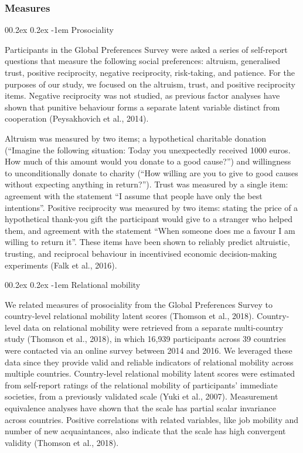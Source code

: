 \documentclass[
  man,floatsintext]{apa6}
\makeatletter
\let\oldparagraph\paragraph
\renewcommand{\paragraph}[1]{\oldparagraph{#1}\mbox{}}
\renewcommand{\paragraph}{\@startsection{paragraph}{4}{\parindent}%
  {0\baselineskip \@plus 0.2ex \@minus 0.2ex}%
  {-1em}%
  {\normalfont\normalsize\bfseries\itshape\typesectitle}}
\makeatother
\begin{document}
\hypertarget{measures}{%
\subsubsection{Measures}\label{measures}}

\hypertarget{prosociality}{%
\paragraph{Prosociality}\label{prosociality}}

Participants in the Global Preferences Survey were asked a series of self-report questions that measure the following social preferences: altruism, generalised trust, positive reciprocity, negative reciprocity, risk-taking, and patience. For the purposes of our study, we focused on the altruism, trust, and positive reciprocity items. Negative reciprocity was not studied, as previous factor analyses have shown that punitive behaviour forms a separate latent variable distinct from cooperation (Peysakhovich et al., 2014).

Altruism was measured by two items; a hypothetical charitable donation (``Imagine the following situation: Today you unexpectedly received 1000 euros. How much of this amount would you donate to a good cause?'') and willingness to unconditionally donate to charity (``How willing are you to give to good causes without expecting anything in return?''). Trust was measured by a single item: agreement with the statement ``I assume that people have only the best intentions''. Positive reciprocity was measured by two items: stating the price of a hypothetical thank-you gift the participant would give to a stranger who helped them, and agreement with the statement ``When someone does me a favour I am willing to return it''. These items have been shown to reliably predict altruistic, trusting, and reciprocal behaviour in incentivised economic decision-making experiments (Falk et al., 2016).

\hypertarget{relational-mobility}{%
\paragraph{Relational mobility}\label{relational-mobility}}

We related measures of prosociality from the Global Preferences Survey to country-level relational mobility latent scores (Thomson et al., 2018). Country-level data on relational mobility were retrieved from a separate multi-country study (Thomson et al., 2018), in which 16,939 participants across 39 countries were contacted via an online survey between 2014 and 2016. We leveraged these data since they provide valid and reliable indicators of relational mobility across multiple countries. Country-level relational mobility latent scores were estimated from self-report ratings of the relational mobility of participants' immediate societies, from a previously validated scale (Yuki et al., 2007). Measurement equivalence analyses have shown that the scale has partial scalar invariance across countries. Positive correlations with related variables, like job mobility and number of new acquaintances, also indicate that the scale has high convergent validity (Thomson et al., 2018).
\end{document}

